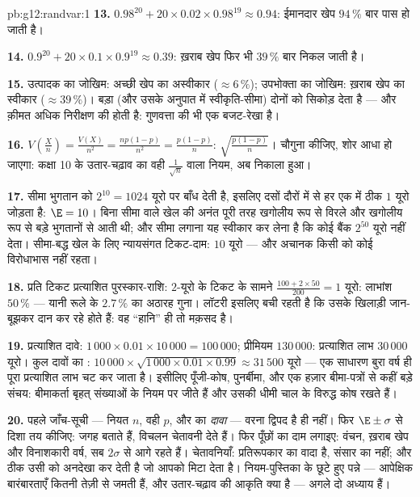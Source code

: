 \begin{solution}{pb:g12:randvar:1}
\textbf{13.} $0.98^{20} + 20 \times 0.02 \times 0.98^{19}
\approx 0.94$: ईमानदार खेप $94\,\%$ बार पास हो जाती है।

\textbf{14.} $0.9^{20} + 20 \times 0.1 \times 0.9^{19}
\approx 0.39$: ख़राब खेप फिर भी $39\,\%$ बार निकल जाती है।

\textbf{15.} उत्पादक का जोखिम: अच्छी खेप का अस्वीकार ($\approx 6\,\%$); उपभोक्ता का
जोखिम: ख़राब खेप का स्वीकार ($\approx 39\,\%$)। बड़ा  (और उसके अनुपात में
स्वीकृति-सीमा) दोनों को सिकोड़ देता है --- और क़ीमत अधिक निरीक्षण की होती है:
गुणवत्ता की भी एक बजट-रेखा है।

\textbf{16.} $V\!\left(\frac Xn\right) = \frac{V(X)}{n^2} =
\frac{np(1-p)}{n^2} = \frac{p(1-p)}{n}$:  $\sqrt{\frac{p(1-p)}{n}}$।  चौगुना कीजिए, शोर आधा हो
जाएगा: कक्षा 10 के उतार-चढ़ाव  का वही $\frac{1}{\sqrt n}$ वाला नियम, अब निकाला हुआ।

\textbf{17.} सीमा भुगतान को $2^{10} = 1024$ यूरो पर बाँध देती है, इसलिए दसों दौरों में
से हर एक  में ठीक $1$ यूरो जोड़ता है: $\E = 10$। बिना सीमा वाले खेल की
अनंत  पूरी तरह खगोलीय रूप से विरले और खगोलीय रूप से बड़े भुगतानों से
आती थी; और सीमा लगाना यह स्वीकार कर लेना है कि कोई बैंक $2^{50}$ यूरो नहीं देता।
सीमा-बद्ध खेल के लिए न्यायसंगत टिकट-दाम: $10$ यूरो --- और अचानक किसी को कोई
विरोधाभास नहीं रहता।

\textbf{18.} प्रति टिकट प्रत्याशित पुरस्कार-राशि: $2$-यूरो के टिकट के सामने
$\frac{100 + 2 \times 50}{200} = 1$ यूरो: लाभांश $50\,\%$ --- यानी रूले के $2.7\,\%$ का अठारह गुना। लॉटरी इसलिए बची
रहती है कि उसके खिलाड़ी जान-बूझकर दान कर रहे होते हैं: वह ``हानि'' ही तो मक़सद
है।

\textbf{19.} प्रत्याशित दावे: $1\,000 \times 0.01 \times
10\,000 = 100\,000$; प्रीमियम $130\,000$: प्रत्याशित लाभ $30\,000$
यूरो। कुल दावों का : $10\,000 \times \sqrt{1\,000 \times 0.01 \times 0.99}
\approx 31\,500$ यूरो --- एक साधारण बुरा वर्ष ही पूरा
प्रत्याशित लाभ चट कर जाता है। इसीलिए पूँजी-कोष, पुनर्बीमा, और एक हज़ार
बीमा-पत्रों से कहीं बड़े संचय: बीमाकर्ता बृहत् संख्याओं के नियम पर जीते हैं और
उसकी धीमी चाल के विरुद्ध कोष रखते हैं।

\textbf{20.} पहले जाँच-सूची --- नियत $n$, वही $p$, और  का
\emph{दावा} --- वरना द्विपद है ही नहीं। फिर $\E \pm \sigma$ से दिशा तय कीजिए:  जगह
बताते हैं, विचलन चेतावनी देते हैं। फिर पूँछों का दाम लगाइए: वंचन, ख़राब खेप और
विनाशकारी वर्ष, सब $2\sigma$ से आगे रहते हैं। चेतावनियाँ:  प्रतिरूपकार का
वादा है, संसार का नहीं; और  ठीक उसी को अनदेखा कर देती है जो आपको
मिटा देता है। नियम-पुस्तिका के छूटे हुए पन्ने --- आपेक्षिक बारंबारताएँ कितनी
तेज़ी से जमती हैं, और उतार-चढ़ाव की आकृति क्या है --- अगले दो अध्याय हैं।
\end{solution}
